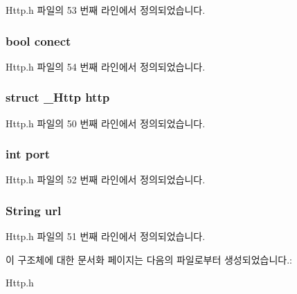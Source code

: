 Http.\-h 파일의 53 번째 라인에서 정의되었습니다.

\hypertarget{struct_http_extends_a506634736b4585cbeac7cbdefec1e540}{
\subsubsection[{conect}]{\setlength{\rightskip}{0pt plus 5cm}bool conect}}\label{struct_http_extends_a506634736b4585cbeac7cbdefec1e540}


Http.\-h 파일의 54 번째 라인에서 정의되었습니다.

\hypertarget{struct_http_extends_aac2793927d10867bce5b93fe1116b97b}{
\subsubsection[{http}]{\setlength{\rightskip}{0pt plus 5cm}struct {\bf \-\_\-\-Http} http}}\label{struct_http_extends_aac2793927d10867bce5b93fe1116b97b}


Http.\-h 파일의 50 번째 라인에서 정의되었습니다.

\hypertarget{struct_http_extends_a63c89c04d1feae07ca35558055155ffb}{
\subsubsection[{port}]{\setlength{\rightskip}{0pt plus 5cm}int port}}\label{struct_http_extends_a63c89c04d1feae07ca35558055155ffb}


Http.\-h 파일의 52 번째 라인에서 정의되었습니다.

\hypertarget{struct_http_extends_a983d3a00cb7e2cdac046d6ef1ce9f8f2}{
\subsubsection[{url}]{\setlength{\rightskip}{0pt plus 5cm}String url}}\label{struct_http_extends_a983d3a00cb7e2cdac046d6ef1ce9f8f2}


Http.\-h 파일의 51 번째 라인에서 정의되었습니다.



이 구조체에 대한 문서화 페이지는 다음의 파일로부터 생성되었습니다.\-:\begin{DoxyCompactItemize}
\item 
Http.\-h\end{DoxyCompactItemize}
